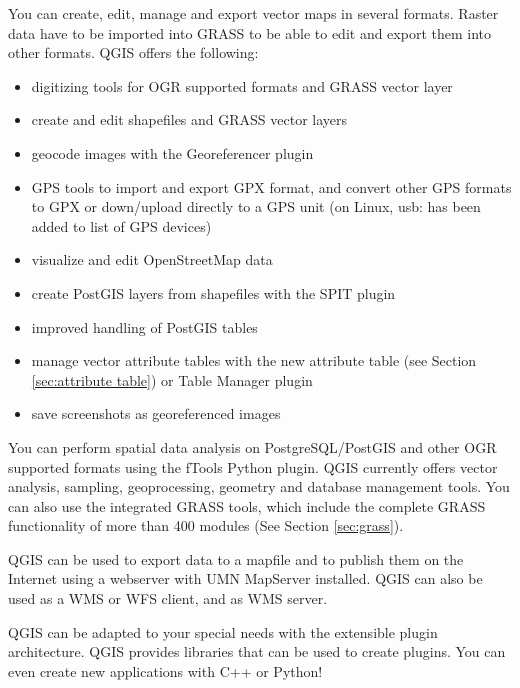 
You can create, edit, manage and export vector maps in several formats. Raster data
have to be imported into GRASS to be able to edit and export them into other
formats. QGIS offers the following: 

\begin{itemize}[label=--]
\item digitizing tools for OGR supported formats and GRASS vector layer
\item create and edit shapefiles and GRASS vector layers
\item geocode images with the Georeferencer plugin
\item GPS tools to import and export GPX format, and convert other GPS
formats to GPX or down/upload directly to a GPS unit (on Linux, usb: has been added
to list of GPS devices)
\item visualize and edit OpenStreetMap data
\item create PostGIS layers from shapefiles with the SPIT plugin 
\item improved handling of PostGIS tables
\item manage vector attribute tables with the new attribute table (see Section 
\ref{sec:attribute table}) or Table Manager plugin
\item save screenshots as georeferenced images
\end{itemize}


You can perform spatial data analysis on PostgreSQL/PostGIS and other OGR
supported formats using the fTools Python plugin. QGIS currently offers
vector analysis, sampling, geoprocessing, geometry and database management
tools. You can also use the integrated GRASS tools, which 
include the complete GRASS functionality of more than 400 modules (See
Section \ref{sec:grass}).


QGIS can be used to export data to a mapfile and to publish them on the
Internet using a webserver with UMN MapServer installed. QGIS can also
be used as a WMS or WFS client, and as WMS server. 


QGIS can be adapted to your special needs with the extensible
plugin architecture. QGIS provides libraries that can be used to create
plugins.  You can even create new applications with C++ or Python!

